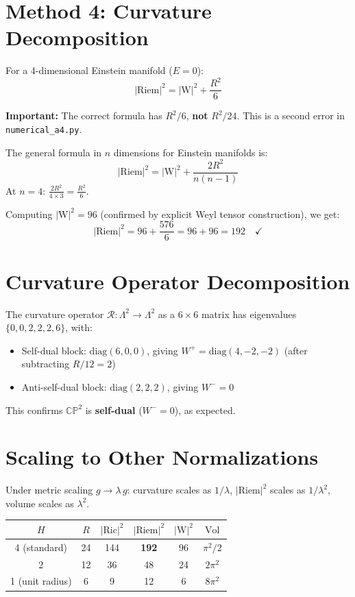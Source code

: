 \documentclass[11pt]{article}
\newcommand{\Riem}{\mathrm{Riem}}
\newcommand{\Ric}{\mathrm{Ric}}
\newcommand{\Weyl}{\mathrm{W}}
\newcommand{\vol}{\mathrm{Vol}}
\begin{document}
\section{Method 4: Curvature Decomposition}

For a 4-dimensional Einstein manifold ($E = 0$):
\begin{equation}
  |\Riem|^2 = |\Weyl|^2 + \frac{R^2}{6}
\end{equation}

\textbf{Important:} The correct formula has $R^2/6$, \textbf{not} $R^2/24$.
This is a second error in \texttt{numerical\_a4.py}.

The general formula in $n$ dimensions for Einstein manifolds is:
\[
  |\Riem|^2 = |\Weyl|^2 + \frac{2R^2}{n(n-1)}
\]
At $n=4$: $\frac{2R^2}{4\times 3} = \frac{R^2}{6}$.

Computing $|\Weyl|^2 = 96$ (confirmed by explicit Weyl tensor construction), we get:
\begin{equation}
  |\Riem|^2 = 96 + \frac{576}{6} = 96 + 96 = 192 \quad\checkmark
\end{equation}

\section{Curvature Operator Decomposition}

The curvature operator $\mathcal{R}: \Lambda^2 \to \Lambda^2$ as a $6\times 6$
matrix has eigenvalues $\{0, 0, 2, 2, 2, 6\}$, with:
\begin{itemize}
  \item Self-dual block: $\text{diag}(6, 0, 0)$, giving
        $W^+ = \text{diag}(4, -2, -2)$ (after subtracting $R/12 = 2$)
  \item Anti-self-dual block: $\text{diag}(2, 2, 2)$, giving
        $W^- = 0$
\end{itemize}
This confirms $\mathbb{CP}^2$ is \textbf{self-dual} ($W^- = 0$), as expected.

\section{Scaling to Other Normalizations}

Under metric scaling $g \to \lambda\,g$: curvature scales as $1/\lambda$,
$|\Riem|^2$ scales as $1/\lambda^2$, volume scales as $\lambda^2$.

\begin{center}
\begin{tabular}{c|c|c|c|c|c}
\hline
$H$ & $R$ & $|\Ric|^2$ & $|\Riem|^2$ & $|\Weyl|^2$ & $\vol$ \\
\hline
4 (standard) & 24 & 144 & \textbf{192} & 96 & $\pi^2/2$ \\
2 & 12 & 36 & 48 & 24 & $2\pi^2$ \\
1 (unit radius) & 6 & 9 & 12 & 6 & $8\pi^2$ \\
\hline
\end{tabular}
\end{center}
\end{document}

